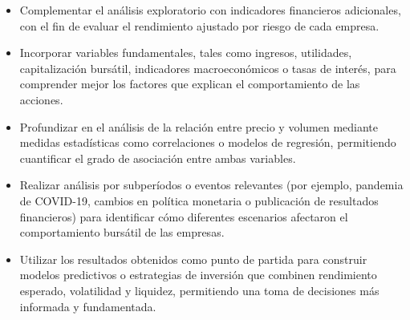 \begin{itemize}
    \item Complementar el análisis exploratorio con indicadores financieros adicionales, con el fin de evaluar el rendimiento ajustado por riesgo de cada empresa.
    \item Incorporar variables fundamentales, tales como ingresos, utilidades, capitalización bursátil, indicadores macroeconómicos o tasas de interés, para comprender mejor los factores que explican el comportamiento de las acciones.
    \item Profundizar en el análisis de la relación entre precio y volumen mediante medidas estadísticas como correlaciones o modelos de regresión, permitiendo cuantificar el grado de asociación entre ambas variables.
    \item Realizar análisis por subperíodos o eventos relevantes (por ejemplo, pandemia de COVID-19, cambios en política monetaria o publicación de resultados financieros) para identificar cómo diferentes escenarios afectaron el comportamiento bursátil de las empresas.
    \item Utilizar los resultados obtenidos como punto de partida para construir modelos predictivos o estrategias de inversión que combinen rendimiento esperado, volatilidad y liquidez, permitiendo una toma de decisiones más informada y fundamentada.
\end{itemize}
